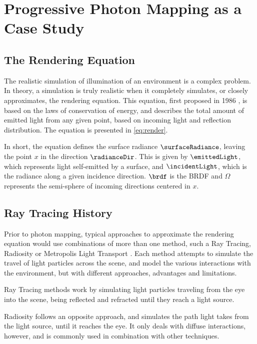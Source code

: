 \documentclass[main.tex]{subfiles}
\begin{document}
\newpage
\section{Progressive Photon Mapping as a Case Study} \label{section:photon}



\subsection{The Rendering Equation}

The realistic simulation of illumination of an environment is a complex problem. In theory, a simulation is truly realistic when it completely simulates, or closely approximates, the rendering equation. This equation, first proposed in 1986 \cite{kajiya1986rendering}, is based on the laws of conservation of energy, and describes the total amount of emitted light from any given point, based on incoming light and reflection distribution. The equation is presented in \cref{eq:render}.


In short, the equation defines the surface radiance $\surfaceRadiance$, leaving the point $x$ in the direction $\radianceDir$. This is given by $\emittedLight$, which represents light self-emitted by a surface, and $\incidentLight$, which is the radiance along a given incidence direction. $\brdf$ is the \acf{BRDF} and $\Omega$ represents the semi-sphere of incoming directions centered in $x$.


\subsection{Ray Tracing History}

Prior to photon mapping, typical approaches to approximate the rendering equation would use combinations of more than one method, such a Ray Tracing, Radiosity or Metropolis Light Transport \cite{wallace1987two,veach1997metropolis}. Each method attempts to simulate the travel of light particles across the scene, and model the various interactions with the environment, but with different approaches, advantages and limitations.

Ray Tracing methods work by simulating light particles traveling from the eye into the scene, being reflected and refracted until they reach a light source.

Radiosity follows an opposite approach, and simulates the path light takes from the light source, until it reaches the eye. It only deals with diffuse interactions, however, and is commonly used in combination with other techniques.
\end{document}
